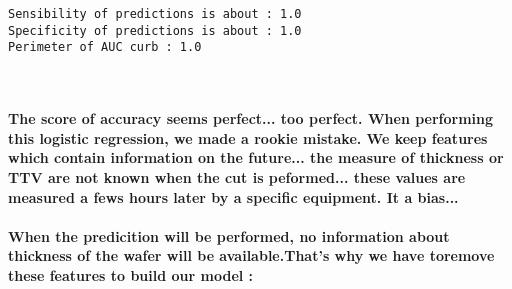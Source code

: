 \documentclass[11pt]{article}
\begin{document}
    \begin{Verbatim}[commandchars=\\\{\}]
Sensibility of predictions is about : 1.0
Specificity of predictions is about : 1.0
Perimeter of AUC curb : 1.0

    \end{Verbatim}

    \begin{center}
    \end{center}
    { \hspace*{\fill} \\}
    
    \paragraph{The score of accuracy seems perfect... too perfect. When
performing this logistic regression, we made a rookie mistake. We keep
features which contain information on the future... the measure of
thickness or TTV are not known when the cut is peformed... these values
are measured a fews hours later by a specific equipment. It a
bias...}\label{the-score-of-accuracy-seems-perfect...-too-perfect.-when-performing-this-logistic-regression-we-made-a-rookie-mistake.-we-keep-features-which-contain-information-on-the-future...-the-measure-of-thickness-or-ttv-are-not-known-when-the-cut-is-peformed...-these-values-are-measured-a-fews-hours-later-by-a-specific-equipment.-it-a-bias...}

\paragraph{When the predicition will be performed, no information about
thickness of the wafer will be available.That's why we have toremove
these features to build our model
:}\label{when-the-predicition-will-be-performed-no-information-about-thickness-of-the-wafer-will-be-available.thats-why-we-have-toremove-these-features-to-build-our-model}
\end{document}
